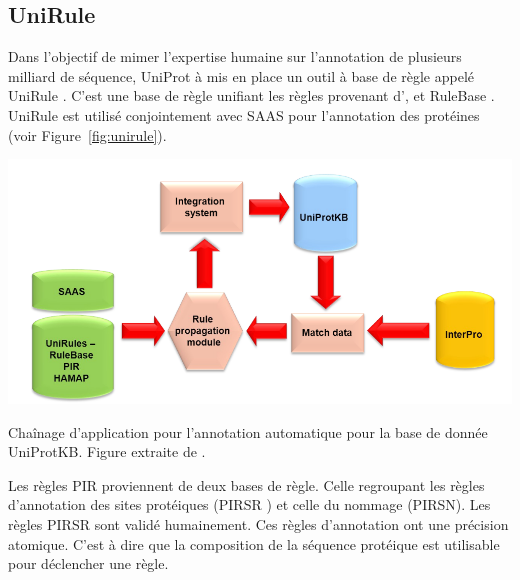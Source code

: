 \begin{refsegment}
    \subsection{UniRule}
    Dans l'objectif de mimer l'expertise humaine sur l'annotation de plusieurs milliard de séquence, UniProt à mis en place un outil à base de règle appelé UniRule \cite{unirule2015,bridge2010unirule}. C'est une base de règle unifiant les règles provenant d',  et RuleBase . UniRule est utilisé conjointement avec \gls{SAAS} \cite{kretschmann2001automatic,uniprot2015} pour l'annotation des protéines (voir Figure~\ref{fig:unirule}).
    
    \begin{shadedfigure}
        \centering
        \includegraphics[width=\textwidth]{img/unirule.png}
        \caption{ Chaînage d'application pour l'annotation automatique pour la base de donnée UniProtKB. Figure extraite de . }
        \label{fig:unirule}
    \end{shadedfigure}

    Les règles \acrshort{PIR} proviennent de deux bases de règle.  Celle regroupant les règles d'annotation des sites protéiques (\acrfull{PIRSR} \cite{vasudevan2011structure}) et celle du nommage (\acrfull{PIRSN}). Les règles \acrfull{PIRSR} sont validé humainement. Ces règles d'annotation ont une précision atomique. C'est à dire que la composition de la séquence protéique est utilisable pour déclencher une règle.
    

\end{refsegment}
